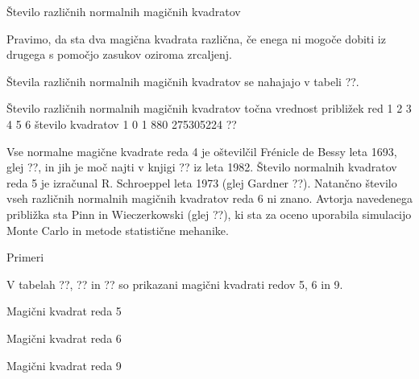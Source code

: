 \documentclass[a4paper,12pt]{article}
\begin{document}
Število različnih normalnih magičnih kvadratov

   Pravimo, da sta dva magična kvadrata različna, če enega ni mogoče dobiti
   iz drugega s pomočjo zasukov oziroma zrcaljenj.

Števila različnih normalnih magičnih kvadratov se nahajajo v tabeli ??.

   Število različnih normalnih magičnih kvadratov
      točna vrednost približek
      red 1 2 3 4 5 6
      število kvadratov 1 0 1 880 275305224 ??

Vse normalne magične kvadrate reda 4 je oštevilčil Frénicle de Bessy
leta 1693, glej ??, in jih je moč najti v knjigi ??
iz leta 1982. Število normalnih kvadratov reda 5 je izračunal
R. Schroeppel leta 1973 (glej Gardner ??).
Natančno število vseh različnih normalnih magičnih kvadratov reda 6 ni znano.
Avtorja navedenega približka sta Pinn in Wieczerkowski (glej ??), ki
sta za oceno uporabila simulacijo Monte Carlo in metode statistične mehanike.


Primeri

V tabelah ??, ?? in ?? so prikazani
magični kvadrati redov 5, 6 in 9.

Magični kvadrat reda 5

Magični kvadrat reda 6

Magični kvadrat reda 9


\end{document}
